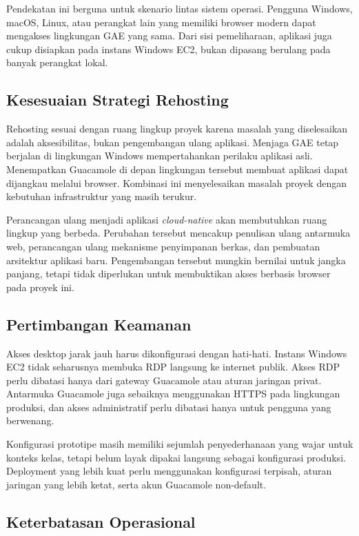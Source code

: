 \documentclass[conference]{IEEEtran}
\begin{document}
Pendekatan ini berguna untuk skenario lintas sistem operasi. Pengguna Windows, macOS, Linux, atau perangkat lain yang memiliki browser modern dapat mengakses lingkungan GAE yang sama. Dari sisi pemeliharaan, aplikasi juga cukup disiapkan pada instans Windows EC2, bukan dipasang berulang pada banyak perangkat lokal.

\subsection{Kesesuaian Strategi Rehosting}

Rehosting sesuai dengan ruang lingkup proyek karena masalah yang diselesaikan adalah aksesibilitas, bukan pengembangan ulang aplikasi. Menjaga GAE tetap berjalan di lingkungan Windows mempertahankan perilaku aplikasi asli. Menempatkan Guacamole di depan lingkungan tersebut membuat aplikasi dapat dijangkau melalui browser. Kombinasi ini menyelesaikan masalah proyek dengan kebutuhan infrastruktur yang masih terukur.

Perancangan ulang menjadi aplikasi \textit{cloud-native} akan membutuhkan ruang lingkup yang berbeda. Perubahan tersebut mencakup penulisan ulang antarmuka web, perancangan ulang mekanisme penyimpanan berkas, dan pembuatan arsitektur aplikasi baru. Pengembangan tersebut mungkin bernilai untuk jangka panjang, tetapi tidak diperlukan untuk membuktikan akses berbasis browser pada proyek ini.

\subsection{Pertimbangan Keamanan}

Akses desktop jarak jauh harus dikonfigurasi dengan hati-hati. Instans Windows EC2 tidak seharusnya membuka RDP langsung ke internet publik. Akses RDP perlu dibatasi hanya dari gateway Guacamole atau aturan jaringan privat. Antarmuka Guacamole juga sebaiknya menggunakan HTTPS pada lingkungan produksi, dan akses administratif perlu dibatasi hanya untuk pengguna yang berwenang.

Konfigurasi prototipe masih memiliki sejumlah penyederhanaan yang wajar untuk konteks kelas, tetapi belum layak dipakai langsung sebagai konfigurasi produksi. Deployment yang lebih kuat perlu menggunakan konfigurasi terpisah, aturan jaringan yang lebih ketat, serta akun Guacamole non-default.

\subsection{Keterbatasan Operasional}
\end{document}
